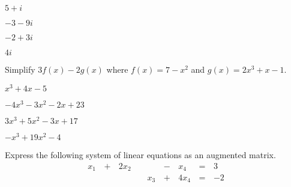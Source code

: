 \documentclass{article}
\begin{document}
\begin{readinessAssuranceTest}
\begin{multicols}{4}
\begin{readinessAssuranceTestChoices}
\item \(5+i\)
\item \(-3-9i\)
\item \(-2+3i\) %
\item \(4i\)
\end{readinessAssuranceTestChoices}
\end{multicols}

\item Simplify \(3f(x)-2g(x)\) where
      \(f(x)=7-x^2\) and
      \(g(x)=2x^3+x-1\).

\begin{multicols}{4}
\begin{readinessAssuranceTestChoices}
\item \(x^3+4x-5\)
\item \(-4x^3-3x^2-2x+23\) %
\item \(3x^3+5x^2-3x+17\)
\item \(-x^3+19x^2-4\)
\end{readinessAssuranceTestChoices}
\end{multicols}

\item Express the following system of linear equations as an augmented matrix.
\begin{alignat*}{5}
  x_1 &\,+\,& 2x_2 &\, \,&     &\,-\,&  x_4 &\,=\,& 3 \\
      &\, \,&      &\, \,& x_3 &\,+\,& 4x_4 &\,=\,& -2
\end{alignat*}


\end{readinessAssuranceTest}
\end{document}
